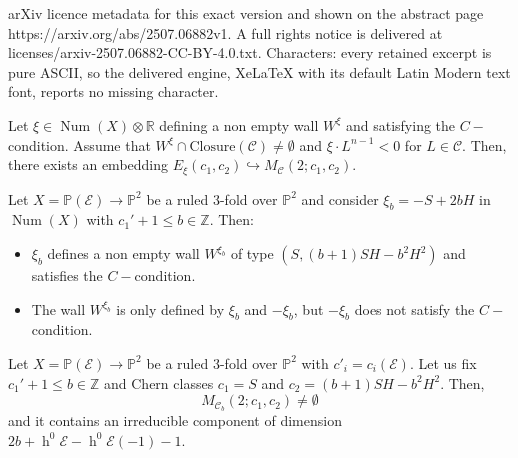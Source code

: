 \documentclass[10pt,a4paper]{amsart}
\newcommand {\Closure}{\mathrm{Closure}}
\newcommand{\Num}{\operatorname{Num}}
\newcommand{\h}{\operatorname{h}}
\begin{document}
arXiv licence metadata for this exact version and shown on the abstract page https://arxiv.org/abs/2507.06882v1. A full rights notice is delivered at licenses/arxiv-2507.06882-CC-BY-4.0.txt. Characters: every retained excerpt is pure ASCII, so the delivered engine, XeLaTeX with its default Latin Modern text font, reports no missing character.
\begin{corollary}
\label{cor_inclusion}
    Let $\xi\in\Num(X)\otimes\mathbb{R}$ defining a non empty wall $W^{\xi}$ and satisfying the $C-$condition. Assume that $W^{\xi}\cap \Closure(\mathcal{C})\neq\emptyset$ and $\xi\cdot L^{n-1}<0$ for  $L\in\mathcal{C}$.  Then, there exists an embedding $E_{\xi}(c_1,c_2)\hookrightarrow M_{\mathcal{C}}(2;c_1,c_2)$. %
\end{corollary}

\begin{lemma}
\label{lemma_chib}
    Let $X=\mathbb{P}(\mathcal{E})\rightarrow\mathbb{P}^2$ be a ruled $3$-fold  over $\mathbb{P}^2$ and  consider $\xi_b= -S+2bH$ in $\Num(X)$ with $c_1'+1\leq b\in\mathbb{Z}$.
    Then:
    \begin{itemize}
        \item[i)] $\xi_b$ defines a non empty wall $W^{\xi_b}$ of type $(S, (b+1)SH-b^2H^2)$ and satisfies the $C-$condition.
        \item[ii)] The wall $W^{\xi_b}$ is only defined by $ \xi_b$ and $-\xi_b$, but $-\xi_b$ does not satisfy the $C-$condition. 
    \end{itemize}
    
    
    
    
\end{lemma}

 \begin{theorem}\label{th_irreducible_comp}Let $X=\mathbb{P}(\mathcal{E})\rightarrow\mathbb{P}^2$ be a ruled  $3$-fold  over $\mathbb{P}^2$ with $c'_i=c_i(\mathcal{E})$.  Let us fix $c_1'+1\leq b\in\mathbb{Z}$ and Chern classes $c_1=S$ and $c_2=(b+1)SH-b^2H^2$. %
 Then,  $$M_{\mathcal{C}_b}(2;c_1,c_2)\neq\emptyset$$ and it contains an irreducible component of dimension $2b+\h^0\mathcal{E}-\h^0\mathcal{E}(-1)-1$.
        \end{theorem}     
\end{document}
